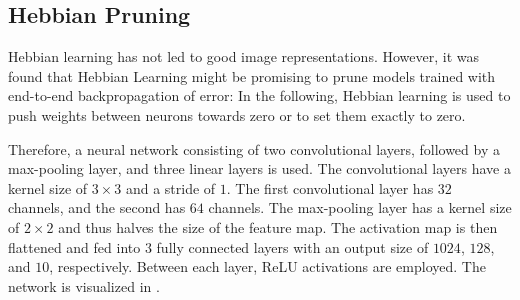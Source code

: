 \subsection{Hebbian Pruning}
Hebbian learning has not led to good image representations.
However, it was found that Hebbian Learning might be promising to prune models trained with end-to-end backpropagation of error:
In the following, Hebbian learning is used to push weights between neurons towards zero or to set them exactly to zero.

Therefore, a neural network consisting of two convolutional layers, followed by a max-pooling layer, and three linear layers is used.
The convolutional layers have a kernel size of $3\times3$ and a stride of $1$. The first convolutional layer has $32$ channels, and the second has $64$ channels.
The max-pooling layer has a kernel size of $2\times2$ and thus halves the size of the feature map. 
The activation map is then flattened and fed into $3$ fully connected layers with an output size of \(1024\), \(128\), and \(10\), respectively.
Between each layer, ReLU activations are employed.
The network is visualized in .

